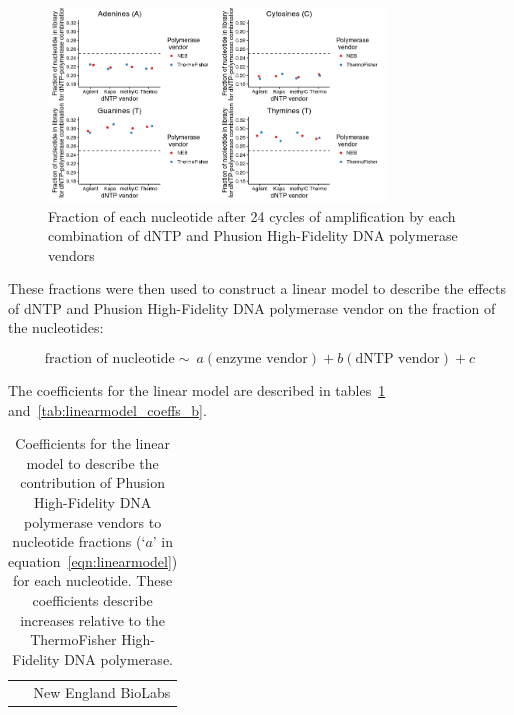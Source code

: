 \documentclass[a4paper, numbers=noenddot]{scrbook}
\begin{document}
\begin{figure}[htbp]
  \centering
  \includegraphics[width=0.8\textwidth]{linearmodel_acgt}
  \caption{Fraction of each nucleotide after 24 cycles of amplification by each combination of dNTP and Phusion High-Fidelity DNA polymerase vendors}
  \label{fig:linearmodel_nt}
\end{figure}

These fractions were then used to construct a linear model to describe the effects of dNTP and Phusion High-Fidelity DNA polymerase vendor on the fraction of the nucleotides:

\begin{equation}
  \label{eqn:linearmodel}
  \textrm{fraction of nucleotide} \sim\ a (\textrm{enzyme vendor}) + b (\textrm{dNTP vendor}) + c
\end{equation}

The coefficients for the linear model are described in tables~\ref{tab:linearmodel_coeffs_a} and~\ref{tab:linearmodel_coeffs_b}.

\begin{table}[h]
  \centering
  \begin{tabular}{r}
    \toprule
    \\
    \midrule
    New England BioLabs\\
    \bottomrule
  \end{tabular}%
  \caption{Coefficients for the linear model to describe the contribution of Phusion High-Fidelity DNA polymerase vendors to nucleotide fractions (`$a$' in equation~\ref{eqn:linearmodel}) for each nucleotide.  These coefficients describe increases relative to the ThermoFisher High-Fidelity DNA polymerase.}
  \label{tab:linearmodel_coeffs_a}
\end{table}
\end{document}
